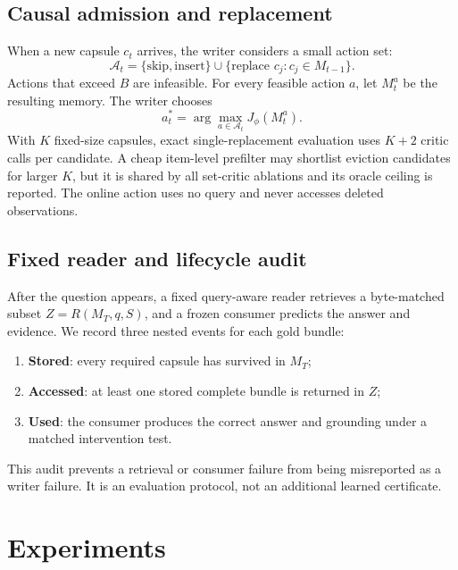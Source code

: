 \documentclass[10pt,twocolumn,letterpaper]{article}
\begin{document}
\subsection{Causal admission and replacement}

When a new capsule $c_t$ arrives, the writer considers a small action set:
\begin{equation}
    \mathcal A_t=\{\text{skip},\text{insert}\}\cup
    \{\text{replace }c_j:c_j\in M_{t-1}\}.
\end{equation}
Actions that exceed $B$ are infeasible.
For every feasible action $a$, let $M_t^a$ be the resulting memory.
The writer chooses
\begin{equation}
    a_t^*=\arg\max_{a\in\mathcal A_t} J_\phi(M_t^a).
    \label{eq:allocator}
\end{equation}
With $K$ fixed-size capsules, exact single-replacement evaluation uses $K+2$ critic calls per candidate.
A cheap item-level prefilter may shortlist eviction candidates for larger $K$, but it is shared by all set-critic ablations and its oracle ceiling is reported.
The online action uses no query and never accesses deleted observations.

\subsection{Fixed reader and lifecycle audit}

After the question appears, a fixed query-aware reader retrieves a byte-matched subset $Z=R(M_T,q,S)$, and a frozen consumer predicts the answer and evidence.
We record three nested events for each gold bundle:
\begin{enumerate}[leftmargin=*,itemsep=1pt]
    \item \textbf{Stored}: every required capsule has survived in $M_T$;
    \item \textbf{Accessed}: at least one stored complete bundle is returned in $Z$;
    \item \textbf{Used}: the consumer produces the correct answer and grounding under a matched intervention test.
\end{enumerate}
This audit prevents a retrieval or consumer failure from being misreported as a writer failure.
It is an evaluation protocol, not an additional learned certificate.

\section{Experiments}
\label{sec:experiments}
\end{document}
